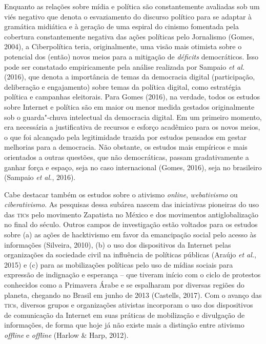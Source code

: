 Enquanto as relações sobre mídia e política são constantemente avaliadas
sob um viés negativo que denota o esvaziamento do discurso político para
se adaptar à gramática midiática e à geração de uma espiral do cinismo
fomentada pela cobertura constantemente negativa das ações políticas
pelo Jornalismo (Gomes, 2004), a Ciberpolítica teria, originalmente, uma
visão mais otimista sobre o potencial dos (então) novos meios para a
mitigação de \emph{déficits} democráticos. Isso pode ser constatado
empiricamente pela análise realizada por Sampaio \emph{et al.} (2016),
que denota a importância de temas da democracia digital (participação,
deliberação e engajamento) sobre temas da política digital, como
estratégia política e campanhas eleitorais. Para Gomes (2016), na
verdade, todos os estudos sobre Internet e política são em maior ou
menor medida gestados originalmente sob o guarda"-chuva intelectual da
democracia digital. Em um primeiro momento, era necessária a
justificativa de recursos e esforço acadêmico para os novos meios, o que
foi alcançado pela legitimidade trazida por estudos pensados em gestar
melhorias para a democracia. Não obstante, os estudos mais empíricos e
mais orientados a outras questões, que não democráticas, passam
gradativamente a ganhar força e espaço, seja no caso internacional
(Gomes, 2016), seja no brasileiro (Sampaio \emph{et al.}, 2016).

Cabe destacar também os estudos sobre o ativismo \emph{\emph{\emph{online}}},
\emph{webativismo} ou \emph{ciberativismo}. As pesquisas dessa subárea
nascem das iniciativas pioneiras do uso das \textsc{tic}s pelo movimento
Zapatista no México e dos movimentos antiglobalização no final do
século. Outros campos de investigação estão voltados para os estudos
sobre (a) as ações de hacktivismo em favor da emancipação social pelo
acesso às informações (Silveira, 2010), (b) o uso dos dispositivos da
Internet pelas organizações da sociedade civil na influência de
políticas públicas (Araújo \emph{et al.}, 2015) e (c) para as
mobilizações políticas pelo uso de mídias sociais para expressão de
indignação e esperança -- que tiveram início com o ciclo de protestos
conhecidos como a Primavera Árabe e se espalharam por diversas regiões
do planeta, chegando no Brasil em junho de 2013 (Castells, 2017). Com o
avanço das \textsc{tic}s, diversos grupos e organizações ativistas incorporam o
uso dos dispositivos de comunicação da Internet em suas práticas de
mobilização e divulgação de informações, de forma que hoje já não existe
mais a distinção entre ativismo \emph{\emph{offline}} e \emph{offline} (Harlow
\& Harp, 2012).

